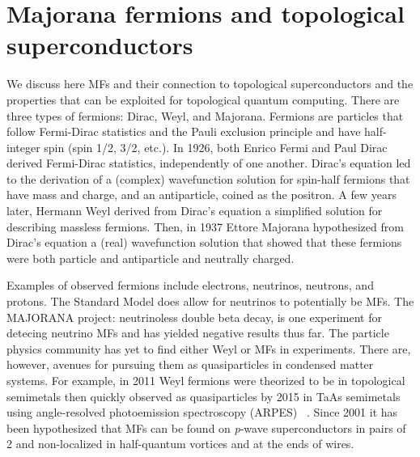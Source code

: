 \section{Majorana fermions and topological superconductors}

We discuss here MFs and their connection to topological superconductors and the properties that can be exploited for topological quantum computing.
There are three types of fermions: Dirac, Weyl, and Majorana.
Fermions are particles that follow Fermi-Dirac statistics and the Pauli exclusion principle and have half-integer spin (spin 1/2, 3/2, etc.).
In 1926, both Enrico Fermi and Paul Dirac derived Fermi-Dirac statistics, independently of one another.
Dirac's equation led to the derivation of a (complex) wavefunction solution for spin-half fermions that have mass and charge, and an antiparticle, coined as the positron.
A few years later, Hermann Weyl derived from Dirac's equation a simplified solution for describing massless fermions.
Then, in 1937 Ettore Majorana hypothesized from Dirac's equation a (real) wavefunction solution that showed that these fermions were both particle and antiparticle and neutrally charged.

Examples of observed fermions include electrons, neutrinos, neutrons, and protons.
The Standard Model does allow for neutrinos to potentially be MFs.
The MAJORANA project: neutrinoless double beta decay, is one experiment for detecing neutrino MFs and has yielded negative results thus far.
The particle physics community has yet to find either Weyl or MFs in experiments.
There are, however, avenues for pursuing them as quasiparticles in condensed matter systems.
For example, in 2011 Weyl fermions were theorized to be in topological semimetals then quickly observed as quasiparticles by 2015 in TaAs semimetals using angle-resolved photoemission spectroscopy (ARPES)  ~\cite{wanTopologicalSemimetalFermiarc2011, xuDiscoveryWeylFermion2015, liWeylSemimetalTaAs2016}.
Since 2001 it has been hypothesized that MFs can be found on \textit{p}-wave superconductors in pairs of 2 and non-localized in half-quantum vortices and at the ends of wires.


